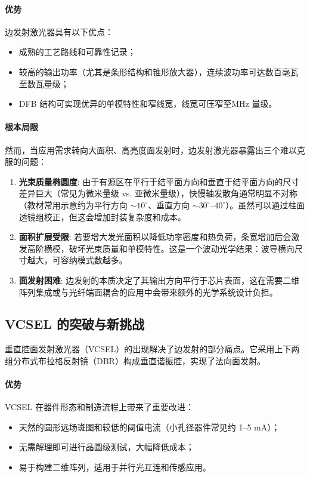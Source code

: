 \paragraph{优势} 边发射激光器具有以下优点：
\begin{itemize}
  \item 成熟的工艺路线和可靠性记录；
  \item 较高的输出功率（尤其是条形结构和锥形放大器），连续波功率可达数百毫瓦至数瓦量级；
  \item DFB 结构可实现优异的单模特性和窄线宽，线宽可压窄至MHz 量级。
\end{itemize}

\paragraph{根本局限} 然而，当应用需求转向大面积、高亮度面发射时，边发射激光器暴露出三个难以克服的问题：
\begin{enumerate}
  \item \textbf{光束质量椭圆度}: 由于有源区在平行于结平面方向和垂直于结平面方向的尺寸差异巨大（常见为微米量级 vs. 亚微米量级），快慢轴发散角通常明显不对称（教材常用示意约为平行方向 $\sim10^\circ$、垂直方向 $\sim30^\circ$--$40^\circ$）\cite{coldren2012}。虽然可以通过柱面透镜组校正，但这会增加封装复杂度和成本。
  \item \textbf{面积扩展受限}: 若要增大发光面积以降低功率密度和热负荷，条宽增加后会激发高阶横模，破坏光束质量和单模特性。这是一个波动光学结果：波导横向尺寸越大，可容纳模式数越多\cite{coldren2012}。
  \item \textbf{面发射困难}: 边发射的本质决定了其输出方向平行于芯片表面，这在需要二维阵列集成或与光纤端面耦合的应用中会带来额外的光学系统设计负担。
\end{enumerate}

\subsection{VCSEL 的突破与新挑战}
垂直腔面发射激光器（VCSEL）的出现解决了边发射的部分痛点。它采用上下两组分布式布拉格反射镜（DBR）构成垂直谐振腔，实现了法向面发射。

\paragraph{优势} VCSEL 在器件形态和制造流程上带来了重要改进：
\begin{itemize}
  \item 天然的圆形远场斑图和较低的阈值电流（小孔径器件常见约 1--5 mA）\cite{coldren2012,sarzala2010oxideproton}；
  \item 无需解理即可进行晶圆级测试，大幅降低成本；
  \item 易于构建二维阵列，适用于并行光互连和传感应用。
\end{itemize}

